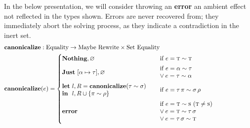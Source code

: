 \documentclass[10pt, letterpaper, oneside]{article}
\newcommand{\error}{\text{\bf error}}
\begin{document}
In the below presentation, we will consider throwing an {\bf error} an ambient effect not reflected in the types shown. Errors are never recovered from; they immediately abort the solving process, as they indicate a contradiction in the inert set.
\begin{align*}
  \text{\bf canonicalize} &: \text{Equality} \to \text{Maybe}~\text{Rewrite} \times \text{Set}~\text{Equality}\\
  \text{\bf canonicalize}&(e) =
  \begin{cases}
    \text{\bf Nothing}, \varnothing &
    \begin{minipage}[h]{15em}
      \vspace{.35em}
      \(
      \text{if } e = \text{\sc t} \sim \text{\sc t}
      \)\\
      \vspace{-.6em}
    \end{minipage}\\
    \text{\bf Just}~[\alpha \mapsto \tau], \varnothing &
    \begin{minipage}[h]{13em}
      \vspace{.35em}
      \(
      \text{if } e = \alpha \sim \tau\\
      \lor e = \tau \sim \alpha
      \)\\
      \vspace{-.6em}
    \end{minipage}\\
    \begin{minipage}[h]{15em}
      \vspace{.35em}
      \(
      \text{\bf let}~l, R = \text{\bf canonicalize}(\tau \sim \sigma)\\
      \text{\bf in}~~l, R \cup \{\pi \sim \rho\}
      \)\\
      \vspace{-.6em}
    \end{minipage} & \text{if } e = \tau\, \pi \sim \sigma\, \rho\\
    \error &
    \begin{minipage}[h]{15em}
      \vspace{.35em}
      \(
      \text{if } e = \text{\sc t} \sim \text{\sc s}\ (\text{\sc t} \ne \text{\sc s})\\
            \lor e = \text{\sc t} \sim \tau\, \sigma\\
            \lor e = \tau\, \sigma \sim \text{\sc t}
      \)\\
      \vspace{-.6em}
    \end{minipage}
  \end{cases}
\end{align*}
\end{document}
